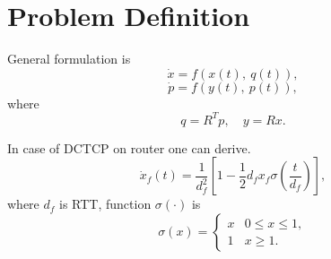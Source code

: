 \section{Problem Definition}

General formulation is
$$
    \dot{x} = f(x(t),~q(t)),
$$
$$
    \dot{p} = f(y(t),~p(t)),
$$
where
$$
    q = R^T p, \quad y = R x.
$$

In case of DCTCP on router one can derive\cite{Lai:2014}.
\begin{equation}
    \dot{x}_f(t) = \frac{1}{d^2_f} \left[ 1 - \frac{1}{2} d_f x_f \sigma\left(\frac{t}{d_f}\right) \right],
\end{equation}
where $d_f$ is RTT, function $\sigma(\cdot)$ is
$$
    \sigma(x) = \left\{\begin{array}{cc}
        x & 0 \le x \le 1, \\
        1 & x \ge 1.
    \end{array}\right.
$$
